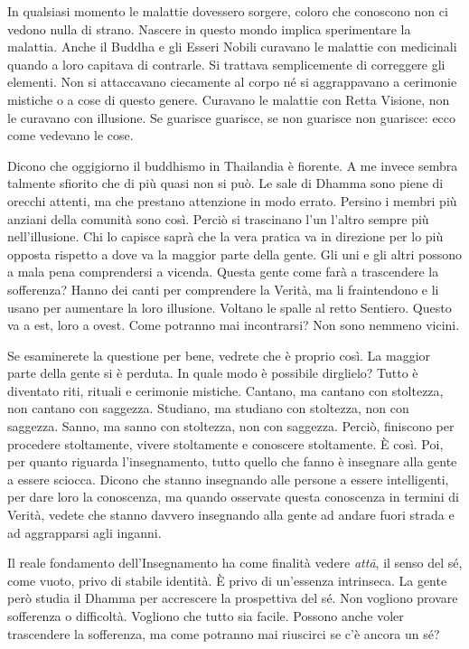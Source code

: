 In qualsiasi momento le malattie dovessero sorgere, coloro che conoscono
non ci vedono nulla di strano. Nascere in questo mondo implica
sperimentare la malattia. Anche il Buddha e gli Esseri Nobili curavano
le malattie con medicinali quando a loro capitava di contrarle. Si
trattava semplicemente di correggere gli elementi. Non si attaccavano
ciecamente al corpo né si aggrappavano a cerimonie mistiche o a cose di
questo genere. Curavano le malattie con Retta Visione, non le curavano
con illusione. Se guarisce guarisce, se non guarisce non guarisce: ecco
come vedevano le cose.

Dicono che oggigiorno il buddhismo in Thailandia è fiorente. A me invece
sembra talmente sfiorito che di più quasi non si può. Le sale di Dhamma
sono piene di orecchi attenti, ma che prestano attenzione in modo
errato. Persino i membri più anziani della comunità sono così. Perciò si
trascinano l'un l'altro sempre più nell'illusione. Chi lo capisce saprà
che la vera pratica va in direzione per lo più opposta rispetto a dove
va la maggior parte della gente. Gli uni e gli altri possono a mala pena
comprendersi a vicenda. Questa gente come farà a trascendere la
sofferenza? Hanno dei canti per comprendere la Verità, ma li
fraintendono e li usano per aumentare la loro illusione. Voltano le
spalle al retto Sentiero. Questo va a est, loro a ovest. Come potranno
mai incontrarsi? Non sono nemmeno vicini.

Se esaminerete la questione per bene, vedrete che è proprio così. La
maggior parte della gente si è perduta. In quale modo è possibile
dirglielo? Tutto è diventato riti, rituali e cerimonie mistiche.
Cantano, ma cantano con stoltezza, non cantano con saggezza. Studiano,
ma studiano con stoltezza, non con saggezza. Sanno, ma sanno con
stoltezza, non con saggezza. Perciò, finiscono per procedere
stoltamente, vivere stoltamente e conoscere stoltamente. È così. Poi,
per quanto riguarda l'insegnamento, tutto quello che fanno è insegnare
alla gente a essere sciocca. Dicono che stanno insegnando alle persone a
essere intelligenti, per dare loro la conoscenza, ma quando osservate
questa conoscenza in termini di Verità, vedete che stanno davvero
insegnando alla gente ad andare fuori strada e ad aggrapparsi agli
inganni.

Il reale fondamento dell'Insegnamento ha come finalità vedere
\emph{attā}, il senso del sé, come vuoto, privo di stabile identità. È
privo di un'essenza intrinseca. La gente però studia il Dhamma per
accrescere la prospettiva del sé. Non vogliono provare sofferenza o
difficoltà. Vogliono che tutto sia facile. Possono anche voler
trascendere la sofferenza, ma come potranno mai riuscirci se c'è ancora
un sé?

